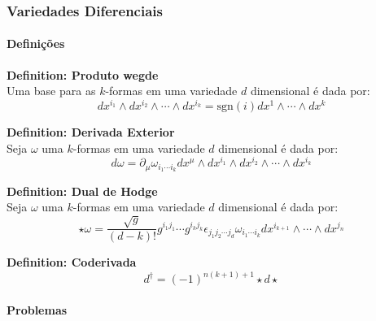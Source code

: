 \subsubsection{Variedades Diferenciais}

\paragraph{Definições}

\begin{framed}
\textbf{\textbf{Definition}: Produto wegde}\\
Uma base para as $k$-formas em uma variedade $d$ dimensional é dada por:
\begin{equation}
dx^{i_1}\wedge dx^{i_2}\wedge\cdots\wedge dx^{i_k} = \mathrm{sgn}(i) dx^{1}\wedge\cdots\wedge dx^{k}
\end{equation}
\end{framed}

\begin{framed}
\textbf{\textbf{Definition}: Derivada Exterior}\\
Seja $\omega$ uma  $k$-formas em uma variedade $d$ dimensional é dada por:
\begin{equation}
d\omega = \partial_\mu \omega_{i_1\cdots i_k} dx^{\mu}\wedge dx^{i_1}\wedge dx^{i_2}\wedge\cdots\wedge dx^{i_k}
\end{equation}
\end{framed}

\begin{framed}
\textbf{\textbf{Definition}: Dual de Hodge}\\
Seja $\omega$ uma  $k$-formas em uma variedade $d$ dimensional é dada por:
\begin{equation}
\star\omega = \frac{\sqrt{g}}{(d-k)!} g^{i_1 j_1} \cdots g^{i_k j_k} \epsilon_{j_1 j_2 \cdots j_d }  \omega_{i_1\cdots i_k} dx^{i_{k+1}}\wedge\cdots\wedge dx^{j_n}
\end{equation}
\end{framed}

\begin{framed}
\textbf{\textbf{Definition}: Coderivada}\\
\begin{equation}
d^\dagger = (-1)^{n(k+1)+1}\star d \star
\end{equation}
\end{framed}

\paragraph{Problemas}

